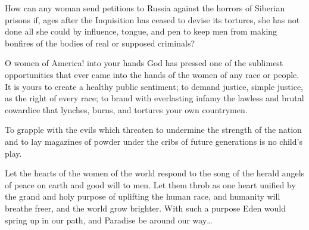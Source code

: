 \documentclass{article}
\begin{document}
How can any woman send petitions to Russia against the horrors of Siberian
prisons if, ages after the Inquisition has ceased to devise its tortures, she
has not done all she could by influence, tongue, and pen to keep men from
making bonfires of the bodies of real or supposed criminals?

O women of America! into your hands God has pressed one of the sublimest
opportunities that ever came into the hands of the women of any race or people.
It is yours to create a healthy public sentiment; to demand justice, simple
justice, as the right of every race; to brand with everlasting infamy the
lawless and brutal cowardice that lynches, burns, and tortures your own
countrymen.

To grapple with the evils which threaten to undermine the strength of the
nation and to lay magazines of powder under the cribs of future generations is
no child’s play.

Let the hearts of the women of the world respond to the song of the herald
angels of peace on earth and good will to men. Let them throb as one heart
unified by the grand and holy purpose of uplifting the human race, and humanity
will breathe freer, and the world grow brighter. With such a purpose Eden would
spring up in our path, and Paradise be around our way\ldots
\end{document}
